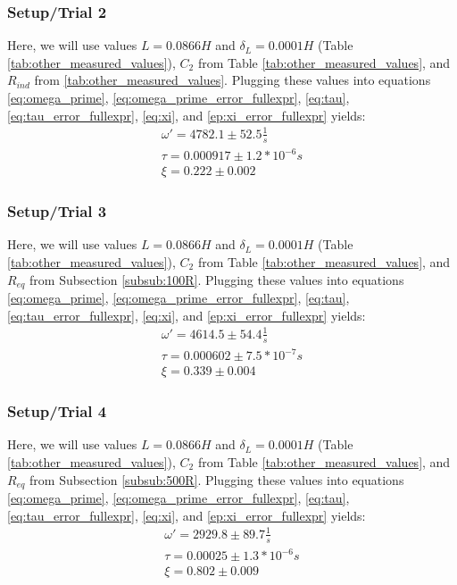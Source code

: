 \documentclass[12pt]{article}
\begin{document}
\subsubsection{Setup/Trial 2}
Here, we will use values $L=0.0866H$ and $\delta_L=0.0001H$ (Table \ref{tab:other_measured_values}), $C_2$ from Table \ref{tab:other_measured_values}, and $R_{ind}$ from \ref{tab:other_measured_values}. Plugging these values into equations \ref{eq:omega_prime}, \ref{eq:omega_prime_error_fullexpr}, \ref{eq:tau}, \ref{eq:tau_error_fullexpr}, \ref{eq:xi}, and \ref{ep:xi_error_fullexpr} yields:
\begin{align}
	\omega'=4782.1\pm52.5\frac{1}{s} \label{num:omega_prime_trial_two} \\
	\tau=0.000917\pm1.2*10^{-6} s \label{num:tau_trial_two} \\
	\xi=0.222\pm0.002 \label{num:xi_trial_two}
\end{align}

\subsubsection{Setup/Trial 3}
Here, we will use values $L=0.0866H$ and $\delta_L=0.0001H$ (Table \ref{tab:other_measured_values}), $C_2$ from Table \ref{tab:other_measured_values}, and $R_{eq}$ from Subsection \ref{subsub:100R}. Plugging these values into equations \ref{eq:omega_prime}, \ref{eq:omega_prime_error_fullexpr}, \ref{eq:tau}, \ref{eq:tau_error_fullexpr}, \ref{eq:xi}, and \ref{ep:xi_error_fullexpr} yields:
\begin{align}
	\omega'=4614.5\pm54.4\frac{1}{s} \label{num:omega_prime_trial_three} \\
	\tau=0.000602\pm7.5*10^{-7} s \label{num:tau_trial_three} \\
	\xi=0.339\pm0.004 \label{num:xi_trial_three}
\end{align}

\subsubsection{Setup/Trial 4}
Here, we will use values $L=0.0866H$ and $\delta_L=0.0001H$ (Table \ref{tab:other_measured_values}), $C_2$ from Table \ref{tab:other_measured_values}, and $R_{eq}$ from Subsection \ref{subsub:500R}. Plugging these values into equations \ref{eq:omega_prime}, \ref{eq:omega_prime_error_fullexpr}, \ref{eq:tau}, \ref{eq:tau_error_fullexpr}, \ref{eq:xi}, and \ref{ep:xi_error_fullexpr} yields:
\begin{align}
	\omega'=2929.8\pm89.7\frac{1}{s} \label{num:omega_prime_trial_four} \\
	\tau=0.00025\pm1.3*10^{-6} s \label{num:tau_trial_four} \\
	\xi=0.802\pm0.009 \label{num:xi_trial_four}
\end{align}
\end{document}
